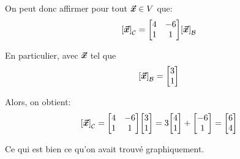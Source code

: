 \documentclass[a4paper]{article}
\begin{document}
{    On peut donc affirmer pour tout $\bm{\protect\vec{x}} \in V$ que:
    \[\left[\bvec{x}\right]_{\mathcal{C}} = \begin{bmatrix} 4 & -6 \\ 1 & 1 \end{bmatrix} \left[\bvec{x}\right]_{\mathcal{B}}\]

    En particulier, avec $\bm{\protect\vec{x}}$ tel que
    \[\left[\bvec{x}\right]_{\mathcal{B}} = \begin{bmatrix} 3 \\ 1 \end{bmatrix} \]

    Alors, on obtient:
    \[\left[\bvec{x}\right]_{\mathcal{C}} = \begin{bmatrix} 4 & -6 \\ 1 & 1 \end{bmatrix} \begin{bmatrix} 3 \\ 1 \end{bmatrix} = 3\begin{bmatrix} 4 \\ 1 \end{bmatrix} + \begin{bmatrix} -6 \\ 1 \end{bmatrix} = \begin{bmatrix} 6 \\ 4 \end{bmatrix}\]

    Ce qui est bien ce qu'on avait trouvé graphiquement.
}
\end{document}
